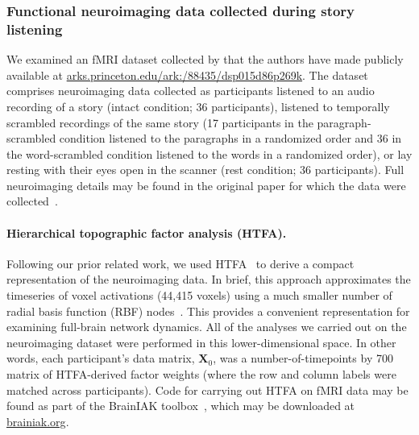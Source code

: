 \documentclass[english]{article}
\begin{document}
\subsubsection*{Functional neuroimaging data collected during story
  listening}
We examined an fMRI dataset collected by \cite{SimoEtal16} that the
authors have made publicly available at
\href{http://arks.princeton.edu/ark:/88435/dsp015d86p269k}{arks.princeton.edu/ark:/88435/dsp015d86p269k}.  The dataset
comprises neuroimaging data collected as participants listened
to an audio recording of a story (intact condition; 36 participants),
listened to temporally scrambled recordings of the same story (17
participants in the paragraph-scrambled condition listened to the
paragraphs in a randomized order and 36 in the word-scrambled
condition listened to the words in a randomized order), or lay resting
with their eyes open in the scanner (rest condition; 36
participants).  Full neuroimaging details may be found in the original
paper for which the data were collected~\citep{SimoEtal16}.

\paragraph{Hierarchical topographic factor analysis (HTFA).}
Following our prior related work, we used HTFA~\citep{MannEtal18} to
derive a compact representation of the neuroimaging data.  In brief,
this approach approximates the timeseries of voxel activations (44,415
voxels) using a much smaller number of radial basis function (RBF)
nodes~\citep[in this case, 700 nodes, as determined by an optimization
procedure described by][]{MannEtal18}.  This provides a convenient
representation for examining full-brain network dynamics.  All of the
analyses we carried out on the neuroimaging dataset were performed in
this lower-dimensional space.  In other words, each participant's data
matrix, $\mathbf{X}_0$, was a number-of-timepoints by 700 matrix of
HTFA-derived factor weights (where the row and column labels were
matched across participants).  Code for carrying out HTFA on fMRI data
may be found as part of the BrainIAK toolbox~\citep{brainiak}, which
may be downloaded at \href{https://brainiak.org/}{brainiak.org}.
\end{document}
